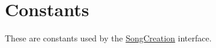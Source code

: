 \hypertarget{group___s_c_const}{}\section{Constants}
\label{group___s_c_const}
These are constants used by the \hyperlink{class_song_creation}{Song\+Creation} interface. 
